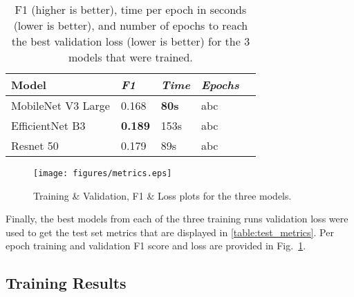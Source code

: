 \documentclass[conference]{IEEEtran}
\begin{document}
    \begin{table}[htbp]
        \caption{F1 (higher is better), time per epoch in seconds (lower is better), and number of epochs to reach the best validation loss (lower is better) for the 3 models that were trained.}
        \centering
        \boldmath
        \begin{tabular}{p{2cm}|p{1cm}|p{1cm}|p{1.2cm}|p{1cm}}
        \hline
        Model & \emph{F1} & \emph{Time} & \emph{Epochs}\\
        \hline
        MobileNet V3 Large & 0.168 & \textbf{80s} & abc\\
        \hline
        EfficientNet B3 & \textbf{0.189} & 153s & abc\\
        \hline
        Resnet 50 & 0.179 & 89s & abc\\
        \hline
        \end{tabular}
        \label{tab:test_metrics}
      \end{table}


\begin{figure}[htbp]
    \centering
    \texttt{[image: figures/metrics.eps]}  
     \caption{Training \& Validation, F1 \& Loss plots for the three models.}
     \label{fig:acc_loss}
  \end{figure}


Finally, the best models from each of the three training runs validation loss were used 
to get the test set metrics that are displayed in \ref{table:test_metrics}. 
Per epoch training and validation F1 score and loss are provided in 
Fig.~\ref{fig:acc_loss}.

\subsection{Training Results}
\end{document}
